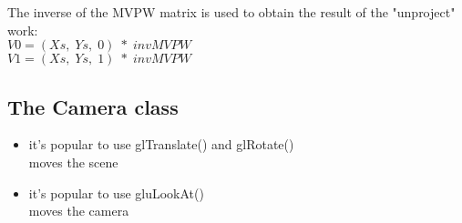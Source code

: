 \documentclass[a4paper,12pt]{book}
\begin{document}
The inverse of the MVPW matrix is used to obtain the result of the "unproject" work:\\
$V0=(Xs, \; Ys, \; 0) \; * \; invMVPW$\\
$V1 = (Xs, \; Ys, \; 1) \; * \; invMVPW$\\

\subsection{The Camera class}
\begin{itemize}
\item it's popular to use glTranslate() and glRotate()\\
\textrightarrow moves the scene
\item it's popular to use gluLookAt()\\
\textrightarrow moves the camera


\end{itemize}
\end{document}
